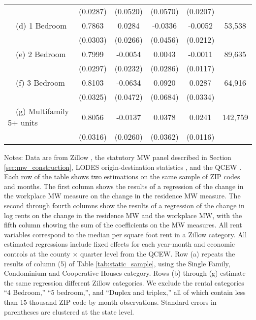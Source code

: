 \begin{landscape}
\begin{table}[ht!]
\begin{tabular}{@{}lccccc@{}}
                                                 & (0.0287) & (0.0520) & (0.0570) & (0.0207) &      \\
        $\quad$(d) 1 Bedroom                     &  0.7863  &  0.0284  &  -0.0336  &  -0.0052  & 53,538 \\
                                                 & (0.0303) & (0.0266) & (0.0456) & (0.0212) &      \\
        $\quad$(e) 2 Bedroom                     &  0.7999  &  -0.0054  &  0.0043  &  -0.0011  & 89,635 \\
                                                 & (0.0297) & (0.0232) & (0.0286) & (0.0117) &      \\
        $\quad$(f) 3 Bedroom                     &  0.8103  &  -0.0634  &  0.0920  &  0.0287  & 64,916 \\
                                                 & (0.0325) & (0.0472) & (0.0684) & (0.0334) &      \\
        $\quad$(g) Multifamily 5+ units          &  0.8056  &  -0.0137  &  0.0378  &  0.0241  & 142,759 \\
                                                 & (0.0316) & (0.0260) & (0.0362) & (0.0116) &      \\ \bottomrule
    \end{tabular}

    \begin{minipage}{.95\linewidth} \footnotesize
        \vspace{2mm}
        Notes:
        Data are from Zillow \parencite{ZillowData}, 
        the statutory MW panel described in Section \ref{sec:mw_construction}, 
        LODES origin-destination statistics \parencite{CensusLODES},
        and the QCEW \parencite{QCEW}.
        Each row of the table shows two estimations on the same sample of ZIP 
        codes and months.
        The first column shows the results of a regression of the change in the 
        workplace MW measure on the change in the residence MW measure.
        The second through fourth columns show the results of a regression of 
        the change in log rents on the change in the residence MW and the 
        workplace MW, with the fifth column showing the sum of the coefficients 
        on the MW measures.
        All rent variables correspond to the median per square foot rent in a 
        Zillow category.
        All estimated regressions include fixed effects for each year-month and 
        economic controls at the county $\times$ quarter level from the QCEW.
        Row (a) repeats the results of column (5) of Table \ref{tab:static_sample}, 
        using the Single Family, Condominium and Cooperative Houses category.
        Rows (b) through (g) estimate the same regression different Zillow 
        categories.
        We exclude the rental categories ``4 Bedroom,'' ``5 bedroom,'', and 
        ``Duplex and triplex,'' all of which contain less than 15 thousand
        ZIP code by month observations.
        Standard errors in parentheses are clustered at the state level.
    \end{minipage}
\end{table}
\end{landscape}
